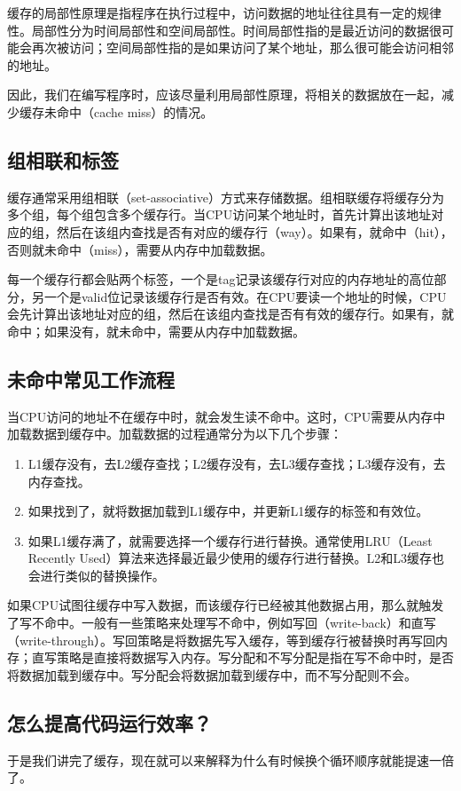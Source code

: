 \documentclass[../main.tex]{subfiles}
\begin{document}
缓存的局部性原理是指程序在执行过程中，访问数据的地址往往具有一定的规律性。局部性分为时间局部性和空间局部性。时间局部性指的是最近访问的数据很可能会再次被访问；空间局部性指的是如果访问了某个地址，那么很可能会访问相邻的地址。

因此，我们在编写程序时，应该尽量利用局部性原理，将相关的数据放在一起，减少缓存未命中（cache miss）的情况。

\subsection{组相联和标签}

缓存通常采用组相联（set-associative）方式来存储数据。组相联缓存将缓存分为多个组，每个组包含多个缓存行。当CPU访问某个地址时，首先计算出该地址对应的组，然后在该组内查找是否有对应的缓存行（way）。如果有，就命中（hit），否则就未命中（miss），需要从内存中加载数据。

每一个缓存行都会贴两个标签，一个是tag记录该缓存行对应的内存地址的高位部分，另一个是valid位记录该缓存行是否有效。在CPU要读一个地址的时候，CPU会先计算出该地址对应的组，然后在该组内查找是否有有效的缓存行。如果有，就命中；如果没有，就未命中，需要从内存中加载数据。

\subsection{未命中常见工作流程}

当CPU访问的地址不在缓存中时，就会发生读不命中。这时，CPU需要从内存中加载数据到缓存中。加载数据的过程通常分为以下几个步骤：
\begin{enumerate}
    \item L1缓存没有，去L2缓存查找；L2缓存没有，去L3缓存查找；L3缓存没有，去内存查找。
    \item 如果找到了，就将数据加载到L1缓存中，并更新L1缓存的标签和有效位。
    \item 如果L1缓存满了，就需要选择一个缓存行进行替换。通常使用LRU（Least Recently Used）算法来选择最近最少使用的缓存行进行替换。L2和L3缓存也会进行类似的替换操作。
\end{enumerate}

如果CPU试图往缓存中写入数据，而该缓存行已经被其他数据占用，那么就触发了写不命中。一般有一些策略来处理写不命中，例如写回（write-back）和直写（write-through）。写回策略是将数据先写入缓存，等到缓存行被替换时再写回内存；直写策略是直接将数据写入内存。写分配和不写分配是指在写不命中时，是否将数据加载到缓存中。写分配会将数据加载到缓存中，而不写分配则不会。

\subsection{怎么提高代码运行效率？}
于是我们讲完了缓存，现在就可以来解释为什么有时候换个循环顺序就能提速一倍了。
\end{document}
